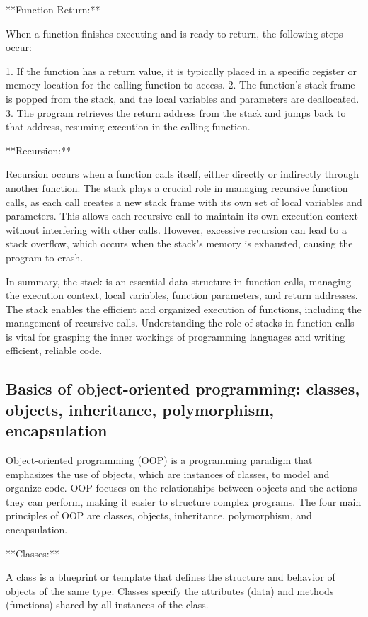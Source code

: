 \documentclass{article}
\begin{document}
**Function Return:**

When a function finishes executing and is ready to return, the following steps occur:

1. If the function has a return value, it is typically placed in a specific register or memory location for the calling function to access.
2. The function's stack frame is popped from the stack, and the local variables and parameters are deallocated.
3. The program retrieves the return address from the stack and jumps back to that address, resuming execution in the calling function.

**Recursion:**

Recursion occurs when a function calls itself, either directly or indirectly through another function. The stack plays a crucial role in managing recursive function calls, as each call creates a new stack frame with its own set of local variables and parameters. This allows each recursive call to maintain its own execution context without interfering with other calls. However, excessive recursion can lead to a stack overflow, which occurs when the stack's memory is exhausted, causing the program to crash.

In summary, the stack is an essential data structure in function calls, managing the execution context, local variables, function parameters, and return addresses. The stack enables the efficient and organized execution of functions, including the management of recursive calls. Understanding the role of stacks in function calls is vital for grasping the inner workings of programming languages and writing efficient, reliable code.





\subsection{Basics of object-oriented programming: classes, objects, inheritance, polymorphism, encapsulation}

Object-oriented programming (OOP) is a programming paradigm that emphasizes the use of objects, which are instances of classes, to model and organize code. OOP focuses on the relationships between objects and the actions they can perform, making it easier to structure complex programs. The four main principles of OOP are classes, objects, inheritance, polymorphism, and encapsulation.

**Classes:**

A class is a blueprint or template that defines the structure and behavior of objects of the same type. Classes specify the attributes (data) and methods (functions) shared by all instances of the class.
\end{document}
